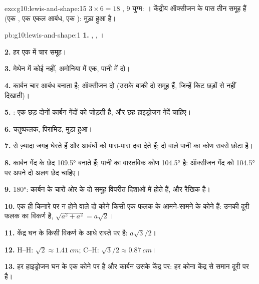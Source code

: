 \begin{solution}{exo:g10:lewis-and-shape:15}
$3 \times 6 = 18$ , 9 युग्म:
। केंद्रीय ऑक्सीजन
के पास तीन समूह हैं (एक , एक एकल आबंध, एक ): 
मुड़ा हुआ है।
\end{solution}

\begin{solution}{pb:g10:lewis-and-shape:1}
\textbf{1.} , ,
।

\textbf{2.} हर एक में चार समूह।

\textbf{3.} मेथेन में कोई नहीं, अमोनिया में एक, पानी में दो।

\textbf{4.} कार्बन चार आबंध बनाता है; ऑक्सीजन दो (उसके बाकी दो
समूह  हैं, जिन्हें किट छड़ों से नहीं दिखाती)।

\textbf{5.} : एक छड़
दोनों कार्बन गेंदों को जोड़ती है, और छह हाइड्रोजन गेंदें चाहिए।

\textbf{6.} चतुष्फलक, पिरामिड, मुड़ा हुआ।

\textbf{7.}   से ज़्यादा जगह घेरते हैं और आबंधों को पास-पास
दबा देते हैं; दो  वाले पानी का कोण सबसे छोटा है।

\textbf{8.} कार्बन गेंद के छेद \ang{109.5} बनाते हैं; पानी का वास्तविक कोण
\ang{104.5} है: ऑक्सीजन गेंद को \ang{104.5} पर अपने दो अलग छेद चाहिए।

\textbf{9.} \ang{180}: कार्बन के चारों ओर के दो समूह विपरीत दिशाओं में होते
हैं, और  रैखिक है।

\textbf{10.} एक ही किनारे पर न होने वाले दो कोने किसी एक फलक के आमने-सामने के कोने
हैं: उनकी दूरी फलक का विकर्ण है, $\sqrt{a^2 + a^2} = a\sqrt{2}$।

\textbf{11.} केंद्र घन के किसी विकर्ण के आधे रास्ते पर है:
$a\sqrt{3}/2$।

\textbf{12.} H--H: $\sqrt{2} \approx \qty{1.41}{cm}$; C--H:
$\sqrt{3}/2 \approx \qty{0.87}{cm}$।

\textbf{13.} हर हाइड्रोजन घन के एक कोने पर है और कार्बन उसके केंद्र पर: हर
कोना केंद्र से समान दूरी पर है।


\end{solution}
